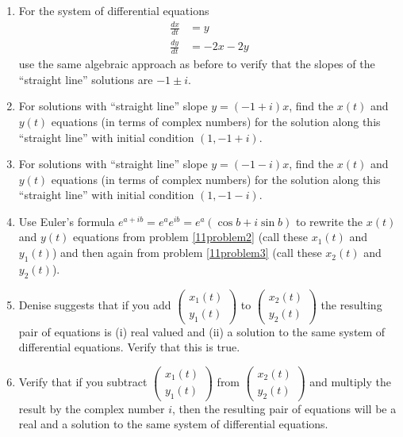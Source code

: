 \clearpage
\begin{enumerate}
\item	For the system of differential equations 
\begin{align*}
\frac{dx}{dt}&=y \\ \frac{dy}{dt}&= -2x-2y
\end{align*}
use the same algebraic approach as before to verify that the slopes of the ``straight line'' solutions are $-1 \pm i$. \label{11problem1}
\vfill

\item For solutions with ``straight line'' slope $y=(-1+i)x$, find the $x(t)$ and $y(t)$ equations (in terms of complex numbers) for the solution along this ``straight line'' with initial condition $(1, -1+i)$. \label{11problem2}
\vfill

\clearpage

\item	For solutions with ``straight line'' slope  $y=(-1-i)x$, find the $x(t)$ and $y(t)$ equations (in terms of complex numbers) for the solution along this ``straight line'' with initial condition $(1, -1-i)$.\label{11problem3} \vfill

\item	Use Euler's formula $e^{a+ib}=e^ae^{ib}=e^a(\cos b+i\sin b)$ to rewrite the $x(t)$ and $y(t)$ equations from problem \ref{11problem2} (call these $x_1(t)$ and $y_1(t)$) and then again from problem \ref{11problem3} (call these $x_2(t)$ and $y_2(t)$). \label{11problem4} \vfill

\clearpage

\item	Denise suggests that if you add $\displaystyle \begin{pmatrix}
x_1(t)\\y_1(t)
\end{pmatrix}$ to $\displaystyle \begin{pmatrix}
x_2(t)\\y_2(t)
\end{pmatrix}$  the resulting pair of equations is (i) real valued and (ii) a solution to the same system of differential equations. Verify that this is true. \label{11problem5} \vfill

\item	Verify that if you subtract $\displaystyle \begin{pmatrix}
x_1(t)\\y_1(t)
\end{pmatrix}$  from $\displaystyle \begin{pmatrix}
x_2(t)\\y_2(t)
\end{pmatrix}$ and multiply the result by the complex number $i$, then the resulting pair of equations will be a real and a solution to the same system of differential equations. \label{11problem6} \vfill


\end{enumerate}
